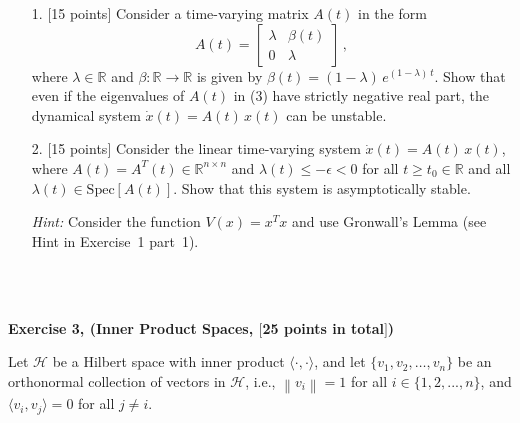 \documentclass[a4paper,10.5pt]{article}
\newcommand{\R}{\mathbb{R}}
\begin{document}
 \\

 \\

 \\

 \\

 \\

\clearpage


\begin{itemize}
\item[1.] $[$15 points$]$  Consider a time-varying matrix $A(t)$ in the form
\begin{equation}
A(t) = \begin{bmatrix}\lambda & \beta(t)\\ 0 & \lambda\end{bmatrix}\,, \tag{3}
\end{equation}
where $\lambda \in \mathbb{R}$ and $\beta\colon \R \to \mathbb{R}$ is given by $\beta(t) = ({1 - \lambda})\, e^{(1 - \lambda)\, t}$. Show that even if the eigenvalues of $A(t)$ in (3) have strictly negative real part,  the dynamical system $\dot{x}(t) = A(t)\, x(t)$ can be unstable.


\item[2.] $[$15 points$]$ Consider the linear time-varying system $\dot{x}(t) = A(t)\, x(t)$, where $A(t) = A^T(t) \in \R^{n \times n}$ and $\lambda(t) \leq -\epsilon < 0$ for all $t \geq t_0 \in \mathbb{R}$ and all $\lambda(t) \in \text{Spec}[A(t)]$. Show that this system is asymptotically stable.

{\em Hint:} Consider the function $V(x)=x^Tx$ and use Gronwall's Lemma (see Hint in Exercise~1 part~1).
\end{itemize} 

 \\

 \\

\clearpage

{\bf Exercise 3, (Inner Product Spaces, $[$25 points in total$]$)}

Let $\mathcal{H}$ be a Hilbert space with inner product $ \langle \cdot, \cdot \rangle$, and let $\{ v_1, v_2, \ldots, v_n \}$ be an orthonormal collection of vectors in $\mathcal{H}$, i.e., $\left\| v_i \right\| = 1$ for all $i \in \{1, 2, ..., n\}$, and $\langle v_i, v_j\rangle = 0$ for all $j \neq i$.
\end{document}
